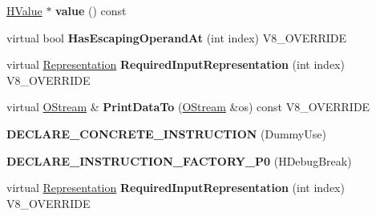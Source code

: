 \begin{DoxyCompactItemize}
\item 
\hypertarget{classv8_1_1internal_1_1_v8___f_i_n_a_l_a998b3feae0e84bbe080297551603911f}{}\hyperlink{classv8_1_1internal_1_1_h_value}{H\+Value} $\ast$ {\bfseries value} () const \label{classv8_1_1internal_1_1_v8___f_i_n_a_l_a998b3feae0e84bbe080297551603911f}

\item 
\hypertarget{classv8_1_1internal_1_1_v8___f_i_n_a_l_ae559b1a39de93c2925ab5815da490738}{}virtual bool {\bfseries Has\+Escaping\+Operand\+At} (int index) V8\+\_\+\+O\+V\+E\+R\+R\+I\+D\+E\label{classv8_1_1internal_1_1_v8___f_i_n_a_l_ae559b1a39de93c2925ab5815da490738}

\item 
\hypertarget{classv8_1_1internal_1_1_v8___f_i_n_a_l_a6c6d1f37f40b113d8f4062f1ffff7215}{}virtual \hyperlink{classv8_1_1internal_1_1_representation}{Representation} {\bfseries Required\+Input\+Representation} (int index) V8\+\_\+\+O\+V\+E\+R\+R\+I\+D\+E\label{classv8_1_1internal_1_1_v8___f_i_n_a_l_a6c6d1f37f40b113d8f4062f1ffff7215}

\item 
\hypertarget{classv8_1_1internal_1_1_v8___f_i_n_a_l_ac450dad970b14246be761ccf5004924b}{}virtual \hyperlink{classv8_1_1internal_1_1_o_stream}{O\+Stream} \& {\bfseries Print\+Data\+To} (\hyperlink{classv8_1_1internal_1_1_o_stream}{O\+Stream} \&os) const V8\+\_\+\+O\+V\+E\+R\+R\+I\+D\+E\label{classv8_1_1internal_1_1_v8___f_i_n_a_l_ac450dad970b14246be761ccf5004924b}

\item 
\hypertarget{classv8_1_1internal_1_1_v8___f_i_n_a_l_ac16fc11a4bb75f6263a91b5e7f989059}{}{\bfseries D\+E\+C\+L\+A\+R\+E\+\_\+\+C\+O\+N\+C\+R\+E\+T\+E\+\_\+\+I\+N\+S\+T\+R\+U\+C\+T\+I\+O\+N} (Dummy\+Use)\label{classv8_1_1internal_1_1_v8___f_i_n_a_l_ac16fc11a4bb75f6263a91b5e7f989059}

\item 
\hypertarget{classv8_1_1internal_1_1_v8___f_i_n_a_l_ab9f1b12fd6271ef0cbc937625985664c}{}{\bfseries D\+E\+C\+L\+A\+R\+E\+\_\+\+I\+N\+S\+T\+R\+U\+C\+T\+I\+O\+N\+\_\+\+F\+A\+C\+T\+O\+R\+Y\+\_\+\+P0} (H\+Debug\+Break)\label{classv8_1_1internal_1_1_v8___f_i_n_a_l_ab9f1b12fd6271ef0cbc937625985664c}

\item 
\hypertarget{classv8_1_1internal_1_1_v8___f_i_n_a_l_a6c6d1f37f40b113d8f4062f1ffff7215}{}virtual \hyperlink{classv8_1_1internal_1_1_representation}{Representation} {\bfseries Required\+Input\+Representation} (int index) V8\+\_\+\+O\+V\+E\+R\+R\+I\+D\+E\label{classv8_1_1internal_1_1_v8___f_i_n_a_l_a6c6d1f37f40b113d8f4062f1ffff7215}


\end{DoxyCompactItemize}
